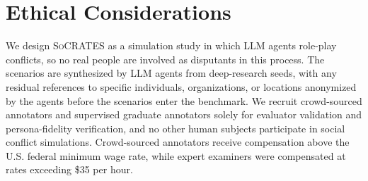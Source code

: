 \documentclass{llmxive}
\providecommand{\algname}{\textsc{SoCRATES}}
\begin{document}
\section*{Ethical Considerations}

We design \algname{} as a simulation study in which LLM agents role-play conflicts, so no real people are involved as disputants in this process. The scenarios are synthesized by LLM agents from deep-research seeds, with any residual references to specific individuals, organizations, or locations anonymized by the agents before the scenarios enter the benchmark.
%
We recruit crowd-sourced annotators and supervised graduate annotators solely for evaluator validation and persona-fidelity verification, and no other human subjects participate in social conflict simulations. Crowd-sourced annotators receive compensation above the U.S. federal minimum wage
rate, while expert examiners were compensated at
rates exceeding \$35 per hour.









\appendix
\end{document}
